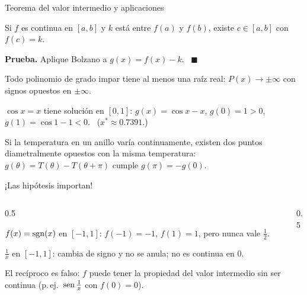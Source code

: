 \documentclass[10pt,aspectratio=169]{beamer}
\begin{document}
\begin{frame}{Teorema del valor intermedio y aplicaciones}
  \begin{teorema}
    Si $f$ es continua en $[a,b]$ y $k$ está entre $f(a)$ y $f(b)$, existe $c\in[a,b]$ con $f(c)=k$.
  \end{teorema}
  \textbf{Prueba.} Aplique Bolzano a $g(x)=f(x)-k$. \ $\blacksquare$
  \begin{ejemplo}
    Todo polinomio de grado impar tiene al menos una raíz real: $P(x)\to\pm\infty$ con signos opuestos en $\pm\infty$.
  \end{ejemplo}
  \begin{ejemplo}
    $\cos x=x$ tiene solución en $[0,1]$: $g(x)=\cos x-x$, $g(0)=1>0$, $g(1)=\cos1-1<0$. \ ($x^*\approx0.7391$.)
  \end{ejemplo}
  \begin{ejemplo}[4: física]
    Si la temperatura en un anillo varía continuamente, existen dos puntos diametralmente opuestos con la misma temperatura:
    $g(\theta)=T(\theta)-T(\theta+\pi)$ cumple $g(\pi)=-g(0)$.
  \end{ejemplo}
\end{frame}

\begin{frame}{¡Las hipótesis importan!}
  \begin{columns}
    \begin{column}{0.5\textwidth}
      \begin{ejemplo}
        $f(x)=\operatorname{sgn}(x)$ en $[-1,1]$: $f(-1)=-1$, $f(1)=1$, pero nunca vale $\frac12$.
      \end{ejemplo}
      \begin{ejemplo}
        $\frac1x$ en $[-1,1]$: cambia de signo y no se anula; no es continua en $0$.
      \end{ejemplo}
      \begin{observacion}
        El recíproco es falso: $f$ puede tener la propiedad del valor intermedio sin ser continua (p.\,ej.\ $\operatorname{sen}\frac1x$ con $f(0)=0$).
      \end{observacion}
    \end{column}
    \begin{column}{0.5\textwidth}
      \centering
    \end{column}
  \end{columns}
\end{frame}
\end{document}
